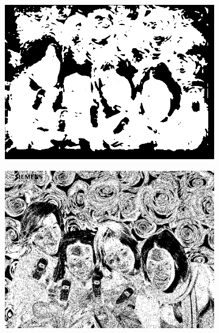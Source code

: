 \begin{figure}[h]
{\begin{subfigure}[b]{0.23\textwidth}
         \includegraphics[width=\textwidth]{images/results/cross/im00593_sch_ecu_skinny_424.png}
     \end{subfigure}
    \hfill
     \begin{subfigure}[b]{0.23\textwidth}
         \centering
         \includegraphics[width=\textwidth]{images/results/cross/im00593_sch_ecu_bayes.png}
     \end{subfigure}}
     

\end{figure}
